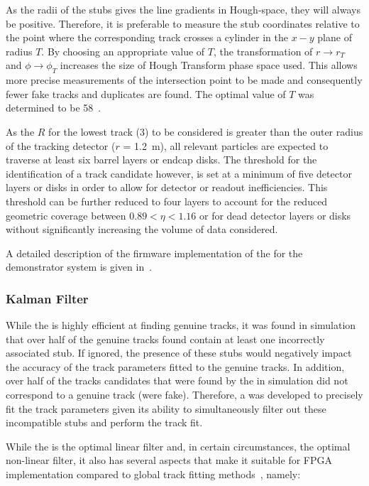 As the radii of the stubs gives the line gradients in Hough-space, they will always be positive.
Therefore, it is preferable to measure the stub coordinates relative to the point where the corresponding track crosses a cylinder in the $x-y$ plane of radius $T$.
By choosing an appropriate value of $T$, the transformation of $r \rightarrow r_{T}$ and $\phi \rightarrow \phi_{T}$ increases the size of Hough Transform phase space used.
This allows more precise measurements of the intersection point to be made and consequently fewer fake tracks and duplicates are found.
The optimal value of $T$ was determined to be 58\cm~\cite{TMTT_JINST}.

As the $R$ for the lowest \pT track (3\GeV) to be considered is greater than the outer radius of the tracking detector ($r$ = 1.2~m), all relevant particles are expected to traverse at least six barrel layers or endcap disks. 
The threshold for the identification of a track candidate however, is set at a minimum of five detector layers or disks in order to allow for detector or readout inefficiencies. 
This threshold can be further reduced to four layers to account for the reduced geometric coverage between $0.89 < \eta < 1.16$ or for dead detector layers or disks without significantly increasing the volume of data considered.

A detailed description of the firmware implementation of the \HT for the demonstrator system is given in~\cite{TMTT_JINST,IEEE}.

\subsubsection{Kalman Filter}\label{subsubsec:KF}
While the \HT is highly efficient at finding genuine tracks, it was found in simulation that over half of the genuine tracks found contain at least one incorrectly associated stub.
If ignored, the presence of these stubs would negatively impact the accuracy of the track parameters fitted to the genuine tracks.
In addition, over half of the tracks candidates that were found by the \HT in simulation did not correspond to a genuine track (\ie were fake).
Therefore, a \KF was developed to precisely fit the track parameters given its ability to simultaneously filter out these incompatible stubs and perform the track fit.

While the \KF is the optimal linear filter and, in certain circumstances, the optimal non-linear filter, it also has several aspects that make it suitable for FPGA implementation compared to global track fitting methods~\cite{Fruhwirth:1987fm}, namely:

